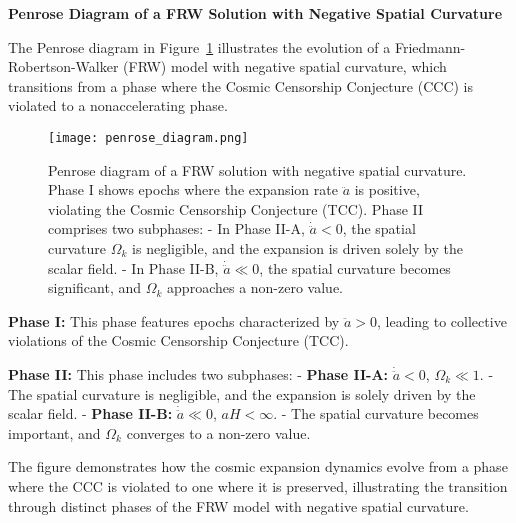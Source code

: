 \documentclass[12pt]{article}
\begin{document}
\noindent \textbf{Penrose Diagram of a FRW Solution with Negative Spatial Curvature}

The Penrose diagram in Figure~\ref{fig:penrose_diagram} illustrates the evolution of a Friedmann-Robertson-Walker (FRW) model with negative spatial curvature, which transitions from a phase where the Cosmic Censorship Conjecture (CCC) is violated to a nonaccelerating phase.

\begin{figure}[h]
    \centering
    \texttt{[image: penrose\_diagram.png]}
    \caption{Penrose diagram of a FRW solution with negative spatial curvature. Phase I shows epochs where the expansion rate $\ddot{a}$ is positive, violating the Cosmic Censorship Conjecture (TCC). Phase II comprises two subphases:
        - In Phase II-A, $\dot{\ddot{a}} < 0$, the spatial curvature $\Omega_k$ is negligible, and the expansion is driven solely by the scalar field.
        - In Phase II-B, $\dot{\ddot{a}} \ll 0$, the spatial curvature becomes significant, and $\Omega_k$ approaches a non-zero value.}
    \label{fig:penrose_diagram}
\end{figure}

\textbf{Phase I:} This phase features epochs characterized by $\ddot{a} > 0$, leading to collective violations of the Cosmic Censorship Conjecture (TCC).

\textbf{Phase II:} This phase includes two subphases:
- \textbf{Phase II-A:} $\dot{\ddot{a}} < 0$, $\Omega_k \ll 1$.
    - The spatial curvature is negligible, and the expansion is solely driven by the scalar field.
- \textbf{Phase II-B:} $\dot{\ddot{a}} \ll 0$, $aH < \infty$.
    - The spatial curvature becomes important, and $\Omega_k$ converges to a non-zero value.

The figure demonstrates how the cosmic expansion dynamics evolve from a phase where the CCC is violated to one where it is preserved, illustrating the transition through distinct phases of the FRW model with negative spatial curvature.
\end{document}
